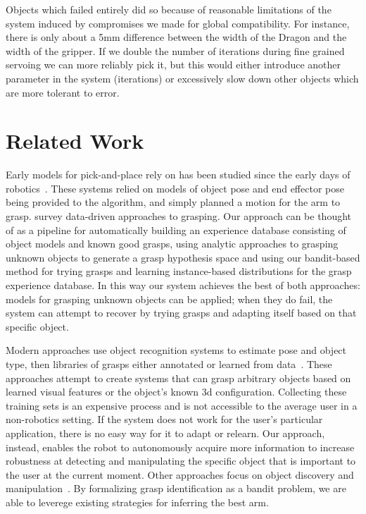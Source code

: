 \documentclass{article}
\begin{document}
Objects which failed entirely did so because of reasonable limitations of the
system induced by compromises we made for global compatibility. For instance,
there is only about a 5mm difference between the width of the Dragon and the width of 
the gripper. If we double the number of iterations
during fine grained servoing we can more reliably pick it, but this would either
introduce another parameter in the system (iterations) or excessively slow down
other objects which are more tolerant to error.


\section{Related Work}

\label{sec:relatedwork}


Early models for pick-and-place rely on has been studied since the
early days of robotics~\citep{brooks83, lozano89}.  These systems
relied on models of object pose and end effector pose being provided
to the algorithm, and simply planned a motion for the arm to grasp.
\citet{bohg13} survey data-driven approaches to grasping.  Our
approach can be thought of as a pipeline for automatically building an
experience database consisting of object models and known good grasps,
using analytic approaches to grasping unknown objects to generate a
grasp hypothesis space and using our bandit-based method for trying
grasps and learning instance-based distributions for the grasp
experience database.  In this way our system achieves the best of both
approaches: models for grasping unknown objects can be applied; when
they do fail, the system can attempt to recover by trying grasps and
adapting itself based on that specific object.  

Modern approaches use object recognition systems to estimate pose and
object type, then libraries of grasps either annotated or learned from
data~\citep{saxena08, goldfeder09, morales03,ciocarlie14}.  These
approaches attempt to create systems that can grasp arbitrary objects
based on learned visual features or the object's known 3d
configuration.  Collecting these training sets is an expensive process
and is not accessible to the average user in a non-robotics
setting. If the system does not work for the user's particular
application, there is no easy way for it to adapt or relearn.  Our
approach, instead, enables the robot to autonomously acquire more
information to increase robustness at detecting and manipulating the
specific object that is important to the user at the current moment.
Other approaches focus on object discovery and
manipulation~\citep{lyubova13, kraft10, collet14, schiebener12}.  By
formalizing grasp identification as a bandit problem, we are able to
leverege existing strategies for inferring the best arm.
\end{document}
